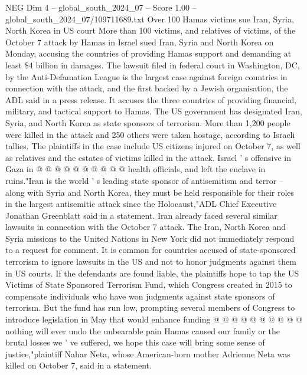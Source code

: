\begin{textsample}{NEG Dim 4 – global\_south\_2024\_07 – Score 1.00 – global\_south\_2024\_07/109711689.txt}  \label{ex:f4_neg_343}
Over 100 Hamas victims sue Iran, Syria, North Korea in US court More than 100 victims, and relatives of victims, of the October 7 attack by Hamas in Israel sued Iran, Syria and North Korea on Monday, accusing the countries of providing Hamas support and demanding at least \$4 billion in damages.
The lawsuit filed in federal court in Washington, DC, by the Anti-Defamation League is the largest case against foreign countries in connection with the attack, and the first backed by a Jewish organisation, the ADL said in a press release.
It accuses the three countries of providing financial, military, and tactical support to Hamas.
The US government has designated Iran, Syria, and North Korea as state sponsors of terrorism.
More than 1,200 people were killed in the attack and 250 others were taken hostage, according to Israeli tallies.
The plaintiffs in the case include US citizens injured on October 7, as well as relatives and the estates of victims killed in the attack.
Israel ' s offensive in Gaza in @ @ @ @ @ @ @ @ @ @ health officials, and left the enclave in ruins."Iran is the world ' s leading state sponsor of antisemitism and terror -- along with Syria and North Korea, they must be held responsible for their roles in the largest antisemitic attack since the Holocaust,"ADL Chief Executive Jonathan Greenblatt said in a statement.
Iran already faced several similar lawsuits in connection with the October 7 attack.
The Iran, North Korea and Syria missions to the United Nations in New York did not immediately respond to a request for comment.
It is common for countries accused of state-sponsored terrorism to ignore lawsuits in the US and not to honor judgments against them in US courts.
If the defendants are found liable, the plaintiffs hope to tap the US Victims of State Sponsored Terrorism Fund, which Congress created in 2015 to compensate individuals who have won judgments against state sponsors of terrorism.
But the fund has run low, prompting several members of Congress to introduce legislation in May that would enhance funding @ @ @ @ @ @ @ @ @ @ nothing will ever undo the unbearable pain Hamas caused our family or the brutal losses we ' ve suffered, we hope this case will bring some sense of justice,"plaintiff Nahar Neta, whose American-born mother Adrienne Neta was killed on October 7, said in a statement.

\end{textsample}
